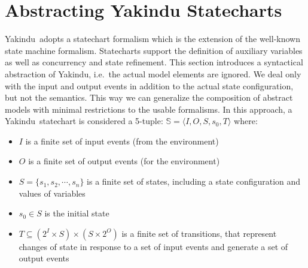 \documentclass[conference]{IEEEtran}
\newcommand{\Yakindu}{\textsf{Yakindu}}
\begin{document}
\section{Abstracting Yakindu Statecharts}
\label{sec:yakindu_semantics}
\Yakindu\ adopts a statechart formalism which is the extension of the well-known state machine formalism. Statecharts support the definition of auxiliary variables as well as concurrency and state refinement. This section introduces a syntactical abstraction of \Yakindu, i.e.~the actual model elements are ignored. We deal only with the input and output events in addition to the actual state configuration, but not the semantics. This way we can generalize the composition of abstract models with minimal restrictions to the usable formalisms. In this approach, a \Yakindu\ statechart is considered a 5-tuple: $\mathbb{S} = \langle I, O, S, s_0, T \rangle$ where:
\begin{itemize}
	
	\item $I$ is a finite set of input events (from the environment)
	
	\item $O$ is a finite set of output events (for the environment)
	
	
%	
%	
	
	
	\item $S = \{s_1, s_2, \cdots , s_n\}$ is a finite set of states, including a state configuration and values of variables
	
	
	\item $s_0 \in S$ is the initial state	
	
	\item $T \subseteq (2^I \times S) \times (S \times 2^O) $ is a finite set of transitions, that represent changes of state in response to a set of input events and generate a set of output events
\end{itemize}
\end{document}
